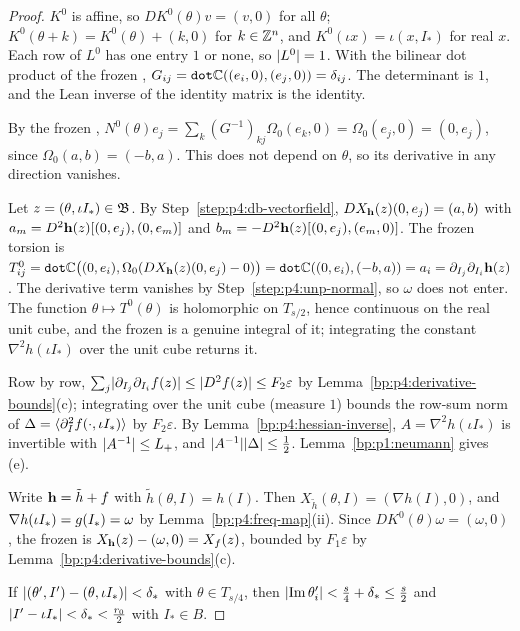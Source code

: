 \begin{proof}
\label{step:p4:unp-frame}
$K^0$ is affine, so $DK^0(\theta)v=(v,0)$ for all $\theta$; $K^0(\theta+k)=K^0(\theta)+(k,0)$ for
$k\in\mathbb{Z}^n$, and $K^0(\iota x)=\iota(x,I_*)$ for real $x$. Each row of $L^0$ has one entry $1$ or
none, so $\lvert L^0\rvert=1$. With the bilinear dot product of the frozen ,
$G_{ij}=\texttt{dot\ensuremath{\mathbb{C}}}((e_i,0),(e_j,0))=\delta_{ij}$. The determinant is $1$,
and the Lean inverse of the identity matrix is the identity.

\label{step:p4:unp-normal}
By the frozen , $N^0(\theta)e_j=\sum_k(G^{-1})_{kj}\Omega_0(e_k,0)=\Omega_0(e_j,0)=(0,e_j)$,
since $\Omega_0(a,b)=(-b,a)$. This does not depend on $\theta$, so its derivative in any direction
vanishes.

\label{step:p4:unp-torsion}
Let $z=(\theta,\iota I_*)\in\mathfrak{B}$. By Step~\ref{step:p4:db-vectorfield},
$DX_{\mathbf{h}}(z)(0,e_j)=(a,b)$ with $a_m=D^2\mathbf{h}(z)[(0,e_j),(0,e_m)]$ and
$b_m=-D^2\mathbf{h}(z)[(0,e_j),(e_m,0)]$. The frozen torsion is
$T^0_{ij}=\texttt{dot\ensuremath{\mathbb{C}}}\bigl((0,e_i),\Omega_0(DX_{\mathbf{h}}(z)(0,e_j)-0)\bigr)=\texttt{dot\ensuremath{\mathbb{C}}}((0,e_i),(-b,a))=a_i=\partial_{I_j}\partial_{I_i}\mathbf{h}(z)$.
The derivative term vanishes by Step~\ref{step:p4:unp-normal}, so $\omega$ does not enter. The
function $\theta\mapsto T^0(\theta)$ is holomorphic on $T_{s/2}$, hence continuous on the real unit
cube, and the frozen  is a genuine integral of it; integrating the constant
$\nabla^2h(\iota I_*)$ over the unit cube returns it.

\label{step:p4:unp-twist}
Row by row, $\sum_j\lvert \partial_{I_j}\partial_{I_i}f(z)\rvert\le\lvert D^2f(z)\rvert\le F_2\varepsilon$ by
Lemma~\ref{bp:p4:derivative-bounds}(c); integrating over the unit cube (measure $1$) bounds the
row-sum norm of $\Delta=\langle \partial^2_If(\cdot,\iota I_*)\rangle$ by $F_2\varepsilon$. By
Lemma~\ref{bp:p4:hessian-inverse}, $A=\nabla^2h(\iota I_*)$ is invertible with $\lvert A^{-1}\rvert\le L_{+}$,
and $\lvert A^{-1}\rvert\lvert \Delta\rvert\le\frac12$. Lemma~\ref{bp:p1:neumann} gives (e).

\label{step:p4:unp-error}
Write $\mathbf{h}=\tilde h+f$ with $\tilde h(\theta,I)=h(I)$. Then $X_{\tilde h}(\theta,I)=(\nabla h(I),0)$,
and $\nabla h(\iota I_*)=g(I_*)=\omega$ by Lemma~\ref{bp:p4:freq-map}(ii). Since
$DK^0(\theta)\omega=(\omega,0)$, the frozen  is
$X_{\mathbf{h}}(z)-(\omega,0)=X_f(z)$, bounded by $F_1\varepsilon$ by
Lemma~\ref{bp:p4:derivative-bounds}(c).

\label{step:p4:unp-ball}
If $\lvert (\theta',I')-(\theta,\iota I_*)\rvert<\delta_*$ with $\theta\in T_{s/4}$, then
$\lvert \operatorname{Im}\theta'_i\rvert<\frac s4+\delta_*\le\frac s2$ and
$\lvert I'-\iota I_*\rvert<\delta_*<\frac{r_0}2$ with $I_*\in B$.
\end{proof}

